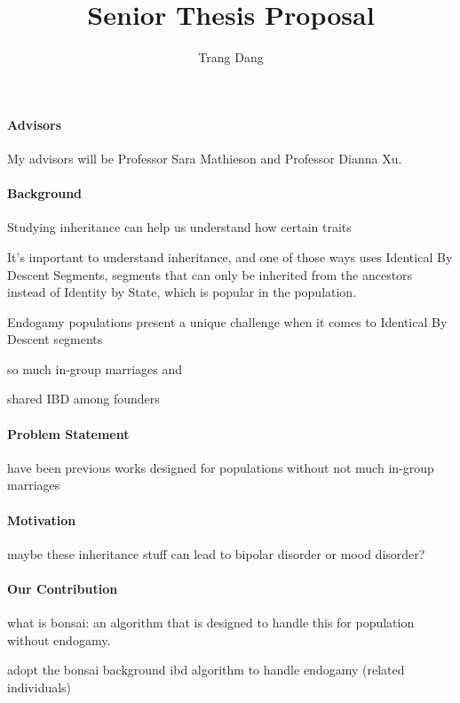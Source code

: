 \documentclass[12pt]{article}
\title{Senior Thesis Proposal}
\author{Trang Dang}
\makeatletter
\let\inserttitle\@title
\let\insertauthor\@author
\makeatother
\begin{document}
\begin{center}
  \LARGE{\inserttitle}

  \Large{\insertauthor}
\end{center}

\paragraph*{Advisors}

My advisors will be Professor Sara Mathieson and Professor Dianna Xu.

\paragraph*{Background}

Studying inheritance can help us understand how certain traits 

It's important to understand inheritance, and one of those ways uses Identical By Descent Segments, segments that can only be inherited from the ancestors instead of Identity by State, which is popular in the population. 

Endogamy populations present a unique challenge when it comes to Identical By Descent segments

so much in-group marriages and 

shared IBD among founders

\paragraph*{Problem Statement}

have been previous works designed for populations without not much in-group marriages

\paragraph*{Motivation} 

maybe these inheritance stuff can lead to bipolar disorder or mood disorder?

\paragraph*{Our Contribution}

what is bonsai: an algorithm that is designed to handle this for population without endogamy.

adopt the bonsai background ibd algorithm to handle endogamy (related individuals)
\end{document}
